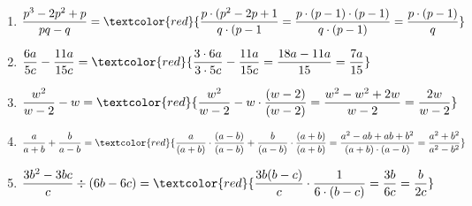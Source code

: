 \documentclass[11pt, a4paper, twoside, fleqn]{article}
\begin{document}
\begin{enumerate}[itemsep=3ex , leftmargin=*]
\item $ \dfrac{p^{3} - 2p^{2} + p}{pq - q} = \textcolor{red}{\dfrac{p \cdot (p^{2} - 2p + 1}{q \cdot (p - 1} = \dfrac{p \cdot (p - 1) \cdot (p - 1)}{q \cdot (p-1)} = \dfrac{p \cdot (p - 1)}{q}} $ 
\item $ \dfrac{6a}{5c} - \dfrac{11a}{15c} = \textcolor{red}{\dfrac{3 \cdot 6a}{3 \cdot 5c} - \dfrac{11a}{15c} = \dfrac{18a - 11a}{15}= \dfrac{7a}{15}} $
\item $ \dfrac{w^{2}}{w - 2} - w = \textcolor{red}{\dfrac{w^{2}}{w - 2} - w \cdot \dfrac{(w - 2)}{(w - 2)} = \dfrac{w^{2} - w^{2} + 2w}{w - 2} = \dfrac{2w}{w - 2}} $
\item $ \dfrac{a}{a + b} + \dfrac{b}{a - b} = \textcolor{red}{\dfrac{a}{(a + b)} \cdot \dfrac{(a - b)}{(a - b)} + \dfrac{b}{(a - b)} \cdot \dfrac{
(a + b)}{(a + b)} = \dfrac{ a^{2} - ab + ab + b^{2}}{(a + b) \cdot (a - b)} = \dfrac{a^{2} + b^{2}}{a^{2} - b^{2}}} $
\item $ \dfrac{3b^{2} - 3bc}{c} \div (6b - 6c) = \textcolor{red}{\dfrac{3b(b - c)}{c} \cdot \dfrac{1}{6 \cdot (b - c)} = \dfrac{3b}{6c} = \dfrac{b}{2c}} $

\end{enumerate}
\end{document}
